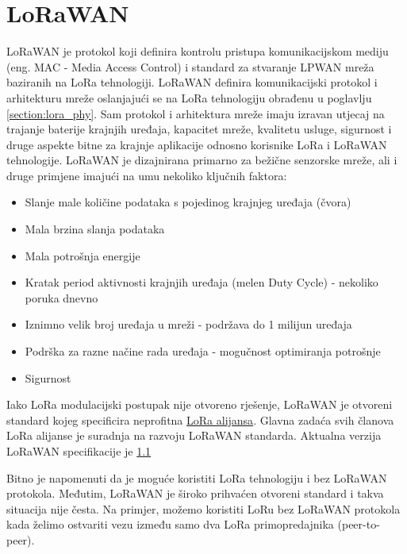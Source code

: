 \newpage
\section{LoRaWAN}
\label{section:lorawan}
LoRaWAN je protokol koji definira kontrolu pristupa komunikacijskom mediju (eng. MAC - Media Access Control) i standard za stvaranje LPWAN mreža baziranih na LoRa tehnologiji.
LoRaWAN definira komunikacijski protokol i arhitekturu mreže oslanjajući se na LoRa tehnologiju obrađenu u poglavlju \ref{section:lora_phy}. Sam protokol i arhitektura mreže imaju izravan utjecaj na trajanje baterije krajnjih uređaja, kapacitet mreže, kvalitetu usluge, sigurnost i druge aspekte bitne za krajnje aplikacije odnosno korisnike LoRa i LoRaWAN tehnologije.
LoRaWAN je dizajnirana primarno za bežične senzorske mreže, ali i druge primjene imajući na umu nekoliko ključnih faktora:
\begin{itemize}
\item Slanje male količine podataka s pojedinog krajnjeg uređaja (čvora)
\item Mala brzina slanja podataka
\item Mala potrošnja energije
\item Kratak period aktivnosti krajnjih uređaja (melen Duty Cycle) - nekoliko poruka dnevno
\item Iznimno velik broj uređaja u mreži - podržava do 1 milijun uređaja
\item Podrška za razne načine rada uređaja - mogučnost optimiranja potrošnje
\item Sigurnost
\end{itemize}
Iako LoRa modulacijski postupak nije otvoreno rješenje, LoRaWAN je otvoreni standard kojeg specificira neprofitna \href{https://lora-alliance.org}{LoRa alijansa}. Glavna zadaća svih članova LoRa alijanse je suradnja na razvoju LoRaWAN standarda. Aktualna verzija LoRaWAN specifikacije je \href{https://lora-alliance.org/resource-hub/lorawantm-specification-v11}{1.1}
\newline

Bitno je napomenuti da je moguće koristiti LoRa tehnologiju i bez LoRaWAN protokola. Međutim, LoRaWAN je široko prihvaćen otvoreni standard i takva situacija nije česta. Na primjer, možemo koristiti LoRu bez LoRaWAN protokola kada želimo ostvariti vezu između samo dva LoRa primopredajnika (peer-to-peer).
        
